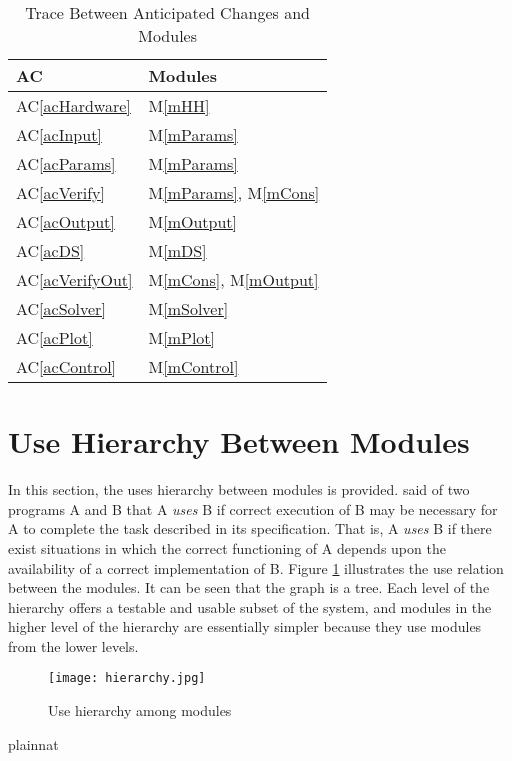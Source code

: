 \documentclass[12pt, titlepage]{article}
\newcommand{\acref}[1]{AC\ref{#1}}
\newcommand{\mref}[1]{M\ref{#1}}
\begin{document}
\begin{table}[H]
\centering
\begin{tabular}{p{} p{}}
\toprule
\textbf{AC} & \textbf{Modules}\\
\midrule
\acref{acHardware} & \mref{mHH}\\
\acref{acInput} & \mref{mParams}\\
\acref{acParams} &\mref{mParams}\\
\acref{acVerify} & \mref{mParams}, \mref{mCons}\\
\acref{acOutput} &  \mref{mOutput}\\
\acref{acDS} & \mref{mDS}\\
\acref{acVerifyOut} & \mref{mCons}, \mref{mOutput}\\
\acref{acSolver} & \mref{mSolver}\\
\acref{acPlot} & \mref{mPlot}\\
\acref{acControl} & \mref{mControl}\\
\bottomrule
\end{tabular}
\caption{Trace Between Anticipated Changes and Modules}
\label{TblACT}
\end{table}

\section{Use Hierarchy Between Modules} \label{SecUse}


In this section, the uses hierarchy between modules is provided. \cite{Parnas1978} said of two programs A and B that A {\em uses} B if correct execution of B may be necessary for A to complete the task described in its specification. That is, A {\em uses} B if there exist situations in which
the correct functioning of A depends upon the availability of a correct implementation of B.  Figure \ref{FigUH} illustrates the use relation between the modules. It can be seen that the graph is a tree. Each level of the hierarchy offers a testable and usable subset of the system, and modules in the higher level of the hierarchy are essentially simpler because they use modules from the lower levels.



\begin{figure}[H]
\centering
\texttt{[image: hierarchy.jpg]}
\caption{Use hierarchy among modules}
\label{FigUH}
\end{figure}


 {plainnat}


\newpage{}
\end{document}
